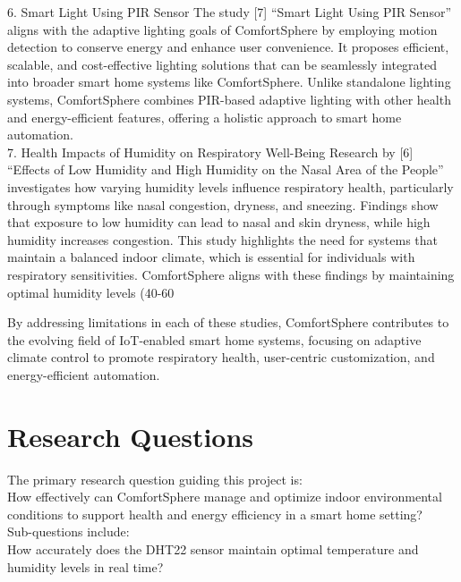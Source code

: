 \documentclass{article}
\begin{document}
6. Smart Light Using PIR Sensor
The study [7] “Smart Light Using PIR Sensor” aligns with the adaptive lighting goals of ComfortSphere by employing motion detection to conserve energy and enhance user convenience. It proposes efficient, scalable, and cost-effective lighting solutions that can be seamlessly integrated into broader smart home systems like ComfortSphere. Unlike standalone lighting systems, ComfortSphere combines PIR-based adaptive lighting with other health and energy-efficient features, offering a holistic approach to smart home automation.\\

7. Health Impacts of Humidity on Respiratory Well-Being
Research by [6] “Effects of Low Humidity and High Humidity on the Nasal Area of the People” investigates how varying humidity levels influence respiratory health, particularly through symptoms like nasal congestion, dryness, and sneezing. Findings show that exposure to low humidity can lead to nasal and skin dryness, while high humidity increases congestion. This study highlights the need for systems that maintain a balanced indoor climate, which is essential for individuals with respiratory sensitivities. ComfortSphere aligns with these findings by maintaining optimal humidity levels (40-60%



By addressing limitations in each of these studies, ComfortSphere contributes to the evolving field of IoT-enabled smart home systems, focusing on adaptive climate control to promote respiratory health, user-centric customization, and energy-efficient automation.

\section{Research Questions}
The primary research question guiding this project is:\\

How effectively can ComfortSphere manage and optimize indoor environmental conditions to support health and energy efficiency in a smart home setting?\\

Sub-questions include:\\

How accurately does the DHT22 sensor maintain optimal temperature and humidity levels in real time?\\
\end{document}
